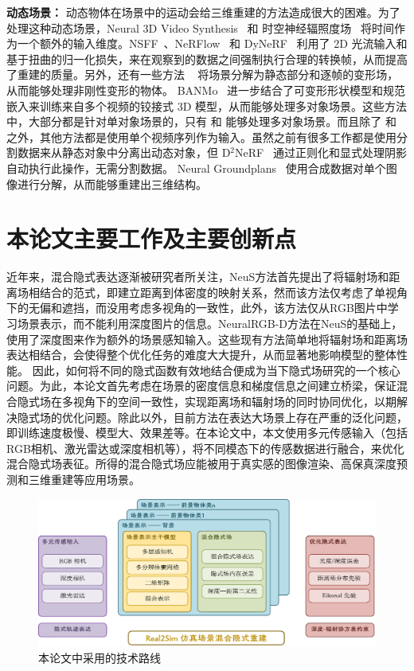 \textbf{动态场景：} 动态物体在场景中的运动会给三维重建的方法造成很大的困难。为了处理这种动态场景，Neural 3D Video Synthesis~\cite{li2021neural} 和 时空神经辐照度场~\cite{xian2021space} 将时间作为一个额外的输入维度。NSFF~\cite{li2020neural}、NeRFlow~\cite{du2021nerflow} 和 DyNeRF~\cite{Gao-ICCV-DynNeRF} 利用了 2D 光流输入和基于扭曲的归一化损失，来在观察到的数据之间强制执行合理的转换帧，从而提高了重建的质量。另外，还有一些方法 ~\cite{park2021nerfies, pumarola2020d, tretschk2021nonrigid, park2021hypernerf} 将场景分解为静态部分和逐帧的变形场，从而能够处理非刚性变形的物体。 BANMo~\cite{yang2022banmo} 进一步结合了可变形形状模型和规范嵌入来训练来自多个视频的铰接式 3D 模型，从而能够处理多对象场景。这些方法中，大部分都是针对单对象场景的，只有 \cite{li2021neural} 和 \cite{yang2022banmo} 能够处理多对象场景。而且除了 \cite{li2021neural} 和 \cite{yang2022banmo} 之外，其他方法都是使用单个视频序列作为输入。虽然之前有很多工作都是使用分割数据来从静态对象中分离出动态对象，但 D$^2$NeRF~\cite{wu2022d} 通过正则化和显式处理阴影自动执行此操作，无需分割数据。 Neural Groundplans~\cite{see3d} 使用合成数据对单个图像进行分解，从而能够重建出三维结构。

\section{本论文主要工作及主要创新点}

近年来，混合隐式表达逐渐被研究者所关注，NeuS\cite{wang_neus_2021}方法首先提出了将辐射场和距离场相结合的范式，即建立距离到体密度的映射关系，然而该方法仅考虑了单视角下的无偏和遮挡，而没用考虑多视角的一致性，此外，该方法仅从RGB图片中学习场景表示，而不能利用深度图片的信息。NeuralRGB-D\cite{azinovic_neural_2022}方法在NeuS的基础上，使用了深度图来作为额外的场景感知输入。这些现有方法简单地将辐射场和距离场表达相结合，会使得整个优化任务的难度大大提升，从而显著地影响模型的整体性能。 因此，如何将不同的隐式函数有效地结合便成为当下隐式场研究的一个核心问题。为此，本论文首先考虑在场景的密度信息和梯度信息之间建立桥梁，保证混合隐式场在多视角下的空间一致性，实现距离场和辐射场的同时协同优化，以期解决隐式场的优化问题。除此以外，目前方法在表达大场景上存在严重的泛化问题，即训练速度极慢、模型大、效果差等。在本论文中，本文使用多元传感输入（包括RGB相机、激光雷达或深度相机等），将不同模态下的传感数据进行融合，来优化混合隐式场表征。所得的混合隐式场应能被用于真实感的图像渲染、高保真深度预测和三维重建等应用场景。


\begin{figure}[t]
    \centering
    \includegraphics[width=\textwidth]{undergraduate-thesis/images/method.pdf}
    \caption{本论文中采用的技术路线}
    \label{fig:method}
\end{figure}

